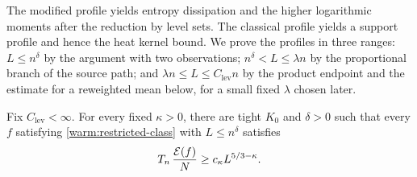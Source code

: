 The modified profile yields entropy dissipation and the higher logarithmic
moments after the reduction by level sets.  The classical profile yields a
support profile and hence the heat kernel bound.  We prove the profiles
in three ranges: \(L\le n^\delta\) by the argument with two observations;
\(n^\delta<L\le\lambda n\) by the proportional branch of the source
path; and \(\lambda n\le L\le C_{\mathrm{lev}}n\) by the product endpoint
and the estimate for a reweighted mean below, for a small fixed \(\lambda\)
chosen later.

\begin{lemma}\label{warm:small-profile}
Fix \(C_{\mathrm{lev}}<\infty\).  For every fixed \(\kappa>0\), there are tight \(K_0\) and
\(\delta>0\) such that every \(f\) satisfying
\eqref{warm:restricted-class} with \(L\le n^\delta\) satisfies
\begin{equation}
 T_n\,\frac{\mathcal E(f)}{N}\ge c_\kappa L^{5/3-\kappa}.
                                                               \label{warm:small-profile-bound}
\end{equation}
\end{lemma}

